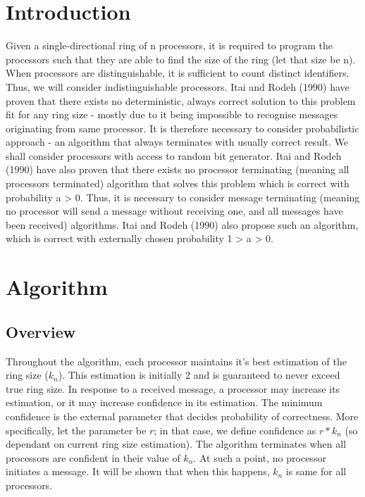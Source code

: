 \documentclass{article}
\begin{document}
\section{Introduction}
Given a single-directional ring of n processors, it is required to program the processors such that they are able to find the size of the ring (let that size be n). When processors are distinguishable, it is sufficient to count distinct identifiers. Thus, we will consider indistinguishable processors. Itai and Rodeh (1990) \cite{ItaiRodeh1990} have proven that there exists no deterministic, always correct solution to this problem fit for any ring size - mostly due to it being impossible to recognise messages originating from same processor. It is therefore necessary to consider probabilistic approach - an algorithm that always terminates with usually correct result. We shall consider processors with access to random bit generator. Itai and Rodeh (1990) have also proven that there exists no processor terminating (meaning all processors terminated) algorithm that solves this problem which is correct with probability a > 0. Thus, it is necessary to consider message terminating (meaning no processor will send a message without receiving one, and all messages have been received) algorithms. Itai and Rodeh (1990) also propose such an algorithm, which is correct with externally chosen probability 1 > a > 0.

\section{Algorithm}
\subsection{Overview}
Throughout the algorithm, each processor maintains it's best estimation of the ring size ($k_n$). This estimation is initially 2 and is guaranteed to never exceed true ring size. In response to a received message, a processor may increase its estimation, or it may increase confidence in its estimation. The minimum confidence is the external parameter that decides probability of correctness. More specifically, let the parameter be $r$; in that case, we define confidence as $r*k_n$ (so dependant on current ring size estimation). The algorithm terminates when all processors are confident in their value of $k_n$. At such a point, no processor initiates a message. It will be shown that when this happens, $k_n$ is same for all processors.
\end{document}
